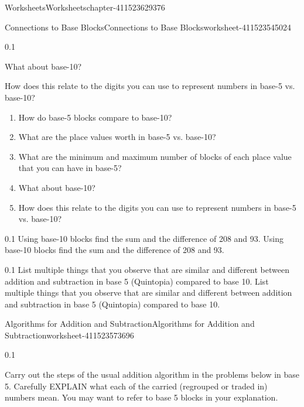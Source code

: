 \documentclass[twoside,11pt,]{book}
\begin{document}
\begin{chapterptx}{Worksheets}{}{Worksheets}{}{}{chapter-411523629376}
\begin{worksheet-section-numberless}{Connections to Base Blocks}{}{Connections to Base Blocks}{}{}{worksheet-411523545024}
\begin{divisionexercise}{4}{}{0.1}
{        What about base-10?

        How does this relate to the digits you can use to represent numbers in base-5 vs. base-10?
      }%
\leavevmode%
\begin{enumerate}[label=(\alph*)]
\item\hypertarget{li-411523532752}{}How do base-5 blocks compare to base-10?%
\item\hypertarget{li-411523532288}{}What are the place values worth in base-5 vs. base-10?%
\item\hypertarget{li-411523531808}{}What are the minimum and maximum number of blocks of each place value that you can have in base-5?%
\item\hypertarget{li-411523531280}{}What about base-10?%
\item\hypertarget{li-411523530832}{}How does this relate to the digits you can use to represent numbers in base-5 vs. base-10?%
\end{enumerate}
\end{divisionexercise}%
\begin{divisionexercise}{5}{}{0.1}{
        Using base-10 blocks find the sum and the difference of 208 and 93.
      }%
\hypertarget{p-411523529104}{}%
Using base-10 blocks find the sum and the difference of 208 and 93.%
\end{divisionexercise}%
\begin{divisionexercise}{6}{}{0.1}{
        List multiple things that you observe that are similar and different between addition and subtraction in base 5 (Quintopia) compared to base 10.
      }%
\hypertarget{p-411523527536}{}%
List multiple things that you observe that are similar and different between addition and subtraction in base 5 (Quintopia) compared to base 10.%
\end{divisionexercise}%
\end{worksheet-section-numberless}
\restoregeometry
%
%
\typeout{************************************************}
\typeout{************************************************}
%
\begin{worksheet-section-numberless}{Algorithms for Addition and Subtraction}{}{Algorithms for Addition and Subtraction}{}{}{worksheet-411523573696}
\begin{divisionexercise}{1}{}{0.1}{
        Carry out the steps of the usual addition algorithm in the problems below in base 5.  Carefully EXPLAIN what each of the carried (regrouped or traded in) numbers mean.  You may want to refer to base 5 blocks in your explanation.

}
\end{divisionexercise}
\end{worksheet-section-numberless}
\end{chapterptx}
\end{document}
